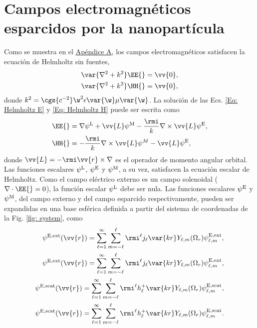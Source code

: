 \section{Campos electromagnéticos esparcidos por la nanopartícula}
Como se muestra en el \hyperref[AppendixScalarPotentials]{Apéndice A}, los campos electromagnéticos satisfacen la ecuación de Helmholtz sin fuentes,
\begin{align}
\var{\nabla^2+k^2}\EE{} = \vv{0},\label{Eq: Helmholtz E}\\
\var{\nabla^2+k^2}\HH{} = \vv{0},\label{Eq: Helmholtz H}
\end{align}
donde $k^2 = \cgs{c^{-2}}\w^2\epsilon\var{\w}\mu\var{\w}$. La solución de las Ecs. \eqref{Eq: Helmholtz E} y \eqref{Eq: Helmholtz H} puede ser escrita como \cite{Low}
\begin{align}
\EE{} &= \nabla\psi^{\rm L} + \vv{L}\psi^{\rm M}-\frac{\rmi}{k}\nabla\times\vv{L}\psi^{\rm E}, \label{Eq: E field in terms of potentials}\\
\HH{} &= -\frac{\rmi}{k}\nabla\times\vv{L}\psi^{M}-\vv{L}\psi^{\rm E}, \label{Eq: H field in terms of potentials}
\end{align}
donde $\vv{L}=-\rmi \vv{r}\times\nabla$ es el operador de momento angular orbital. Las funciones escalares $\psi^{\rm L}$, $\psi^{\rm E}$ y $\psi^{\rm M}$, a su vez, satisfacen la ecuación escalar de Helmholtz. Como el campo eléctrico externo es un campo solenoidal ($\nabla\cdot\EE{}=0$), la función escalar $\psi^{\rm L}$ debe ser nula. Las funciones escalares $\psi^{\rm E}$ y $\psi^{\rm M}$, del campo externo y del campo esparcido respectivamente, pueden ser expandidas en una base esférica definida a partir del sistema de coordenadas de la Fig. \ref{fig: system}, como \cite{de1999relativistic}
\begin{align}
\psi^{\rm E, \text{ext}}(\vv{r})=\sum_{\ell =1}^{\infty}\sum_{m=-\ell}^{\ell}\rmi^{\ell}j_{\ell}\var{kr}Y_{\ell, m}(\Omega_r)\psi_{\ell, m}^{\rm E, \text{ext}},\\
\psi^{\rm E, \text{ext}}(\vv{r})=\sum_{\ell =1}^{\infty}\sum_{m=-\ell}^{\ell}\rmi^{\ell}j_{\ell}\var{kr}Y_{\ell, m}(\Omega_r)\psi_{\ell, m}^{\rm E, \text{ext}},\\
\psi^{\rm E, \text{scat}}(\vv{r})=\sum_{\ell =1}^{\infty}\sum_{m=-\ell}^{\ell}\rmi^{\ell}h_{\ell}^{+}\var{kr}Y_{\ell, m}(\Omega_r)\psi_{\ell, m}^{\rm E, \text{scat}},\\
\psi^{\rm E, \text{scat}}(\vv{r})=\sum_{\ell =1}^{\infty}\sum_{m=-\ell}^{\ell}\rmi^{\ell}h_{\ell}^{+}\var{kr}Y_{\ell, m}(\Omega_r)\psi_{\ell, m}^{\rm E, \text{scat}}.
\end{align}
